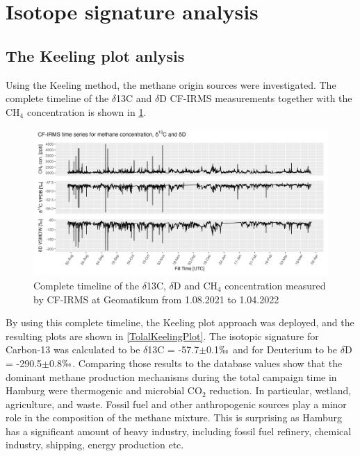 \section{Isotope signature analysis} \label{Keeling}
\subsection{The Keeling plot anlysis}
Using the Keeling method, the methane origin sources were investigated. The complete timeline of the $\delta$13C and $\delta$D CF-IRMS measurements together with the CH$_4$ concentration is shown in \cref{TotalIRMSTimeline}. 
\begin{figure}[htbp]
 \centering
 \includegraphics[width=1\textwidth]{figures/Appendix/CH4_Timelines/4_CH4_Total_Timeline.png}
 \caption[$\delta$13C, $\delta$2H and CH$_4$ timeline for CF-IRMS Measument]{Complete timeline of the $\delta$13C, $\delta$D and CH$_4$ concentration measured by CF-IRMS at Geomatikum from 1.08.2021 to 1.04.2022}
 \label{TotalIRMSTimeline}
\end{figure}
By using this complete timeline, the Keeling plot approach was deployed, and the resulting plots are shown in \cref{TolalKeelingPlot}. The isotopic signature for Carbon-13 was calculated to be $\delta$13C = -57.7$\pm $0.1$\permil$ and for Deuterium to be $\delta$D = -290.5$\pm $0.8$\permil$.  Comparing those results to the database values show that the dominant methane production mechanisms during the total campaign time in Hamburg were thermogenic and microbial CO$_2$ reduction. In particular, wetland, agriculture, and waste. Fossil fuel and other anthropogenic sources play a minor role in the composition of the methane mixture. This is surprising as Hamburg has a significant amount of heavy industry, including fossil fuel refinery, chemical industry, shipping, energy production etc.
